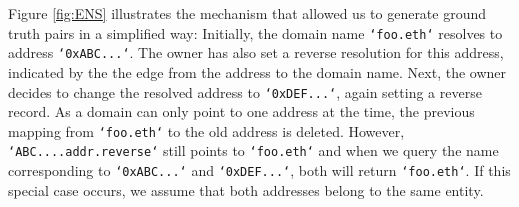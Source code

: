 \documentclass[12pt,a4paper,titlepage,oneside,english]{article}
\begin{document}
Figure \ref{fig:ENS} illustrates the mechanism that allowed us to generate ground truth pairs in a simplified way: Initially, the domain name \texttt{`foo.eth`} resolves to address \texttt{`0xABC...`}. The owner has also set a reverse resolution for this address, indicated by the the edge from the address to the domain name. Next, the owner decides to change the resolved address to \texttt{`0xDEF...`}, again setting a reverse record.  As a domain can only point to one address at the time, the previous mapping from \texttt{`foo.eth`} to the old address is deleted. However, \texttt{`ABC....addr.reverse`} still points to \texttt{`foo.eth`} and when we query the name corresponding to \texttt{`0xABC...`} and \texttt{`0xDEF...`}, both will return \texttt{`foo.eth`}.
If this special case occurs, we assume that both addresses belong to the same entity.

\begin{figure*}[h!]
	\begin{center}
		\caption{Simplified Schematic Representation of a Record Change to Another Address}
		\label{fig:ENS}
	\end{center}
\end{figure*}
\end{document}
